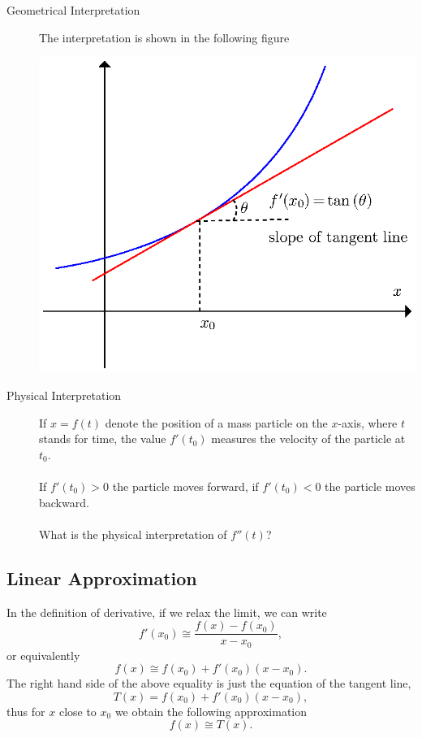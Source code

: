 \documentclass[letterpaper,10pt,twoside,twocolumn,openany]{book}
\begin{document}
\begin{description}
    \item[Geometrical Interpretation] The interpretation is shown in the
    following figure
    
    \includegraphics[scale=0.83]{supplement-1.eps}
    
    \item[Physical Interpretation] If $x = f ( t)$ denote the position of a mass particle on the $x$-axis, where $t$ stands for time, the value $f' ( t_0)$ measures the velocity of the particle at $t_0$.
    \\~\\
    If $f' ( t_0) > 0$ the particle moves forward, if $f' ( t_0) < 0$ the particle moves backward.
    \\~\\
    What is the physical interpretation of $f'' ( t)$?
\end{description}
\newpage

\subsection{Linear Approximation}
In the definition of derivative, if we relax the limit, we can write
\[ f' ( x_0) \cong \frac{f ( x) - f ( x_0)}{x - x_0}, \]
or equivalently
\[ f ( x) \cong f ( x_0) + f' ( x_0) ( x - x_0). \]
The right hand side of the above equality is just the equation of the tangent line,
\[ T ( x) = f ( x_0) + f' ( x_0) ( x - x_0), \]
thus for $x$ close to $x_0$ we obtain the following approximation
\[ f ( x) \cong T ( x). \]
\end{document}
